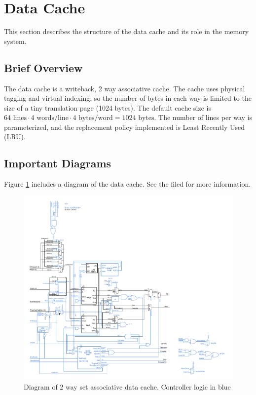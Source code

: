 \section{Data Cache}
This section describes the structure of the data cache and its role in the memory system.

\subsection{Brief Overview}

The data cache is a writeback, 2 way associative cache. 
The cache uses physical tagging and virtual indexing, so the number of bytes in each way is limited to the size of a tiny translation page (1024 bytes). 
The default cache size is $64 \text{ lines} \cdot 4 \text{ words/line} \cdot 4 \text{ bytes/word} = 1024 \text{ bytes}$. 
The number of lines per way is parameterized, and the replacement policy implemented is Least Recently Used (LRU).

\subsection{Important Diagrams}

	Figure \ref{fig:dcachediag} includes a diagram of the data cache.
	See the filed for more information.
	\begin{figure}
	\label{fig:dcachediag}
	\centering
	\includegraphics[width=\textwidth]{images/dataCache.pdf}
	\caption{Diagram of 2 way set associative data cache. Controller logic in blue}
	\end{figure}

